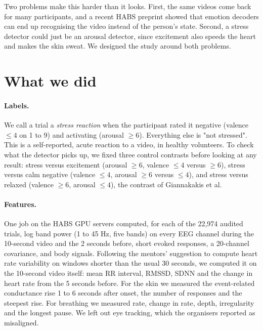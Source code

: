 \documentclass[10pt]{article}
\begin{document}
Two problems make this harder than it looks. First, the same videos come back
for many participants, and a recent HABS preprint showed that emotion decoders
can end up recognising the video instead of the person's state. Second, a
stress detector could just be an arousal detector, since excitement also
speeds the heart and makes the skin sweat. We designed the study around both
problems.

\section{What we did}

\paragraph{Labels.} We call a trial a \emph{stress reaction} when the
participant rated it negative (valence $\le 4$ on 1 to 9) and activating
(arousal $\ge 6$). Everything else is "not stressed". This is a self-reported,
acute reaction to a video, in healthy volunteers. To check what the detector
picks up, we fixed three control contrasts before looking at any result:
stress versus excitement (arousal $\ge 6$, valence $\le 4$ versus $\ge 6$),
stress versus calm negative (valence $\le 4$, arousal $\ge 6$ versus $\le 4$),
and stress versus relaxed (valence $\ge 6$, arousal $\le 4$), the contrast of
Giannakakis et al.

\paragraph{Features.} One job on the HABS GPU servers computed, for each of
the 22,974 audited trials, log band power (1 to 45 Hz, five bands) on every EEG
channel during the 10-second video and the 2 seconds before, short evoked
responses, a 20-channel covariance, and body signals. Following the mentors'
suggestion to compute heart rate variability on windows shorter than the usual
30 seconds, we computed it on the 10-second video itself: mean RR interval,
RMSSD, SDNN and the change in heart rate from the 5 seconds before. For the
skin we measured the event-related conductance rise 1 to 6 seconds after
onset, the number of responses and the steepest rise. For breathing we
measured rate, change in rate, depth, irregularity and the longest pause. We
left out eye tracking, which the organisers reported as misaligned.
\end{document}
